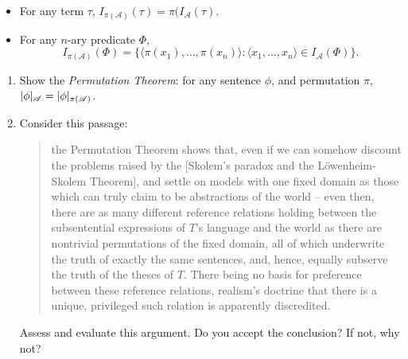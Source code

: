 {\begin{enumerate}
\begin{itemize}
	\item For any term $\tau$, $I_{\pi(\mathscr{A})}(\tau) = \pi(I_{\mathscr{A}}(\tau)$.
	\item For any $n$-ary predicate $\Phi$, $$I_{\pi(\mathscr{A})}(\Phi) = \{\langle \pi(x_{1}),\ldots,\pi(x_{n})\rangle:\langle x_{1},\ldots, x_{n}\rangle \in I_{\mathscr{A}}(\Phi)\}.$$
\end{itemize}  \begin{enumerate}
	\item Show the \emph{Permutation Theorem}: for any sentence $\phi$, and permutation $\pi$, $|\phi|_{\mathscr{A}} = |\phi|_{\mathscr{\pi(A)}}$.
	\item Consider this passage: \begin{quotation}
		the Permutation Theorem shows that, even if we can somehow discount the problems raised by the [Skolem's paradox and the L\"owenheim-Skolem Theorem], and settle on models with one fixed domain as those which can truly claim to be abstractions of the world – even then, there are as many different reference relations holding between the subsentential expressions of $T$'s language and the world as there are nontrivial permutations of the fixed domain, all of which underwrite the truth of exactly the same sentences, and, hence, equally subserve the truth of the theses of $T$. There being no basis for preference between these reference relations, realism's doctrine that there is a unique, privileged such relation is apparently discredited. \citep[53--4]{taymodtrr}
	\end{quotation}Assess and evaluate this argument. Do you accept the conclusion? If not, why not?
\end{enumerate}
 \end{enumerate}


}



